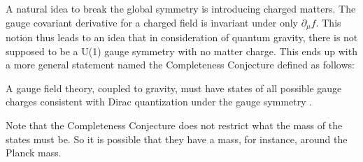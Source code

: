 \indent A natural idea to break the global symmetry is introducing charged matters. The gauge covariant derivative for a charged field is invariant under only $\partial _{\mu} f$. This notion thus leads to an idea that in consideration of quantum gravity, there is not supposed to be a U(1) gauge symmetry with no matter charge. This ends up with a more general statement named the Completeness Conjecture defined as follows:
\begin{tcolorbox}[title=Completeness Conjecture,
    title filled=false,
    colback=blue!5!white,
    colframe=blue!75!black]
    A gauge field theory, coupled to gravity, must have states of all possible gauge charges consistent with Dirac quantization under the gauge symmetry \parencite{polchinski_monopoles_2004}.  %
\end{tcolorbox} 
Note that the Completeness Conjecture does not restrict what the mass of the states must be. So it is possible that they have a mass, for instance, around the Planck mass.

